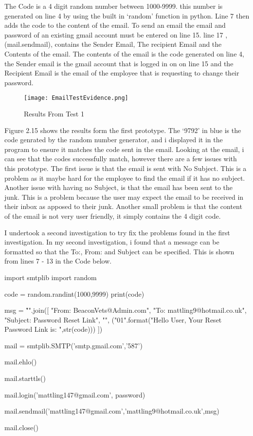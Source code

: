 The Code is a 4 digit random number between 1000-9999. this number is generated on line 4 by using the built in `random' function in python. Line 7 then adds the code to the content of the email. To send an email the email and password of an existing gmail account must be entered on line 15. line 17 , (mail.sendmail), contains the Sender Email, The recipient Email and the Contents of the email. The contents of the email is the code generated on line 4, the Sender email is the gmail account that is logged in on on line 15 and the Recipient Email is the email of the employee that is requesting to change their password.


\begin{figure}[H]
\caption{Results From Test 1} \label{fig:Results From Test 1}
\hfill\texttt{[image: EmailTestEvidence.png]}\hspace*{\fill}
\end{figure}


Figure 2.15 shows the results form the first prototype. The `9792' in blue is the code genrated by the random number generator, and i displayed it in the program to ensure it matches the code sent in the email. Looking at the email, i can see that the codes successfully match, however there are a few issues with this prototype. The first issue is that the email is sent with No Subject. This is a problem as it maybe hard for the employee to find the email if it has no subject. Another issue with having no Subject, is that the email has been sent to the junk. This is a problem because the user may expect the email to be received in their inbox as apposed to their junk. Another small problem is that the content of the email is not very user friendly, it simply contains the 4 digit code. \par

\pagebreak

I undertook a second investigation to try fix the problems found in the first investigation. In my second investigation, i found that a message can be formatted so that the To:, From: and Subject can be specified. This is shown from lines 7 - 13 in the Code below.

\begin{python}
import smtplib
import random

code = random.randint(1000,9999)
print(code)

msg = "\r\n".join([
  "From: BeaconVets@Admin.com",
  "To: mattling9@hotmail.co.uk",
  "Subject: Password Reset Link",
  "",
  ("{0}{1}".format("Hello User, \n \n Your Reset Password Link is:  ",str(code)))
  ])

mail = smtplib.SMTP('smtp.gmail.com','587')

mail.ehlo()

mail.starttls()

mail.login('mattling147@gmail.com', password)

mail.sendmail('mattling147@gmail.com','mattling9@hotmail.co.uk',msg)

mail.close()

\end{python}

